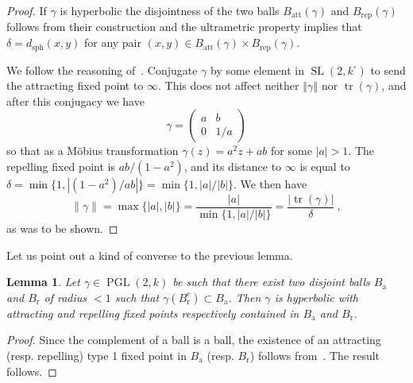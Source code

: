 \documentclass[11pt]{article}
\newtheorem{lemm}[theo]{Lemma}
\theoremstyle{definition}
\numberwithin{equation}{section}
\numberwithin{figure}{section}
\numberwithin{table}{section}
\DeclareMathOperator{\tr}{tr}
\DeclareMathOperator{\sph}{sph}
\DeclareMathOperator{\SL}{SL}
\DeclareMathOperator{\PGL}{PGL}
\newcommand{\norm}[1]{\left\Vert#1\right\Vert}
\newcommand{\abs}[1]{\left\vert#1\right\vert}
\newcommand{\att}{\mathrm{att}}
\newcommand{\rep}{\mathrm{rep}}
\begin{document}
\begin{proof}
If $\gamma$ is hyperbolic the disjointness of the two balls $B_\att(\gamma)$ and $B_\rep(\gamma)$ follows from their construction and the ultrametric property implies that $\delta = d_{\sph} (x,y)$ for any pair $(x,y)\in B_\att(\gamma) \times B_\rep(\gamma)$.

We follow the reasoning of~\cite[Lem.~2.1]{kleinbif}. Conjugate $\gamma$ by some element in $\SL(2,k^\circ)$ to send the attracting fixed point to $\infty$. This does not affect neither $\norm{\gamma}$ nor $\tr(\gamma)$, and after this
conjugacy we have
\[
\gamma =
\begin{pmatrix} a & b \\ 0 & 1/a
\end{pmatrix}
\]
so that as a M\"obius transformation
$\gamma(z) = a^2z+ ab$ for some $\abs{a}>1$. The repelling fixed point is $ab/(1-a^2)$, and its distance to $\infty$ is equal to $\delta = \min \{ 1, |(1-a^2)/ab|\} = \min \{ 1, {\abs{a}}/{\abs{b}}\}$. We then have
\[
\| \gamma \| = \max\{ |a|, |b|\} = \frac{|a|}{\min \{ 1, {\abs{a}}/{\abs{b}}\}} = \frac{|\tr(\gamma)|}{\delta}~,
\]
as was to be shown.
\end{proof}

Let us point out a kind of converse to the previous lemma.

\begin{lemm}\label{lem:distinct balls}
Let $\gamma \in \PGL(2,k)$ be such that there exist two disjoint balls $B_\mathrm{a}$ and $B_\mathrm{r}$ of radius $<1$ such that $\gamma(B_\mathrm{r}^c)\subset B_\mathrm{a}$. Then $\gamma$ is hyperbolic with attracting and repelling fixed points respectively contained in $B_\mathrm{a}$ and $B_\mathrm{r}$.
\end{lemm}

\begin{proof}
Since the complement of a ball is a ball, the existence of an attracting (resp. repelling) type 1 fixed point in $B_\mathrm{a}$ (resp. $B_\mathrm{r}$) follows from~\cite[Thm.~10.69]{baker-rumely}. The result follows.
\end{proof}
\end{document}
